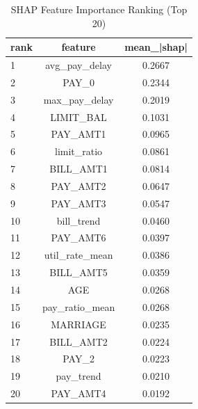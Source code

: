 \begin{table}
\centering
\caption{SHAP Feature Importance Ranking (Top 20)}
\label{tab:shap_ranking}
\begin{tabular}{lcc}
\toprule
rank & feature & mean_|shap| \\
\midrule
1 & avg_pay_delay & 0.2667 \\
2 & PAY_0 & 0.2344 \\
3 & max_pay_delay & 0.2019 \\
4 & LIMIT_BAL & 0.1031 \\
5 & PAY_AMT1 & 0.0965 \\
6 & limit_ratio & 0.0861 \\
7 & BILL_AMT1 & 0.0814 \\
8 & PAY_AMT2 & 0.0647 \\
9 & PAY_AMT3 & 0.0547 \\
10 & bill_trend & 0.0460 \\
11 & PAY_AMT6 & 0.0397 \\
12 & util_rate_mean & 0.0386 \\
13 & BILL_AMT5 & 0.0359 \\
14 & AGE & 0.0268 \\
15 & pay_ratio_mean & 0.0268 \\
16 & MARRIAGE & 0.0235 \\
17 & BILL_AMT2 & 0.0224 \\
18 & PAY_2 & 0.0223 \\
19 & pay_trend & 0.0210 \\
20 & PAY_AMT4 & 0.0192 \\
\bottomrule
\end{tabular}
\end{table}
